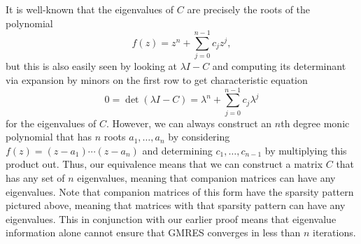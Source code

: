 \documentclass{article}
\begin{document}
It is well-known that the eigenvalues of $C$ are precisely the roots of the polynomial
\[
f(z)=z^n+\sum_{j=0}^{n-1}c_jz^j,
\]
but this is also easily seen by looking at $\lambda I-C$ and computing its determinant via expansion by minors on the first row to get characteristic equation
\[
0=\det(\lambda I-C)=\lambda^n+\sum_{j=0}^{n-1}c_j\lambda^j
\]
for the eigenvalues of $C$. However, we can always construct an $n$th degree monic polynomial that has $n$ roots $a_1,\ldots,a_n$ by considering $f(z)=(z-a_1)\cdots(z-a_n)$ and determining $c_1,\ldots,c_{n-1}$ by multiplying this product out. Thus, our equivalence means that we can construct a matrix $C$ that has any set of $n$ eigenvalues, meaning that companion matrices can have any eigenvalues. Note that companion matrices of this form have the sparsity pattern pictured above, meaning that matrices with that sparsity pattern can have any eigenvalues. This in conjunction with our earlier proof means that eigenvalue information alone cannot ensure that GMRES converges in less than $n$ iterations.
\end{document}
